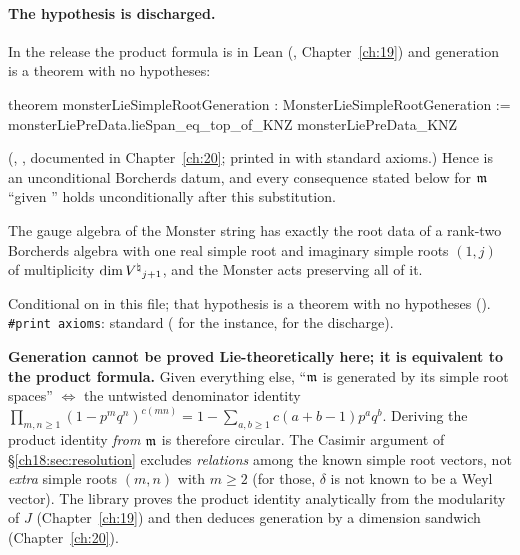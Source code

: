 \paragraph{The hypothesis is discharged.}  In the release the product formula is in Lean
(, Chapter~\ref{ch:19}) and generation is a theorem with no hypotheses:
\begin{leancode}
theorem monsterLieSimpleRootGeneration : MonsterLieSimpleRootGeneration :=
  monsterLiePreData.lieSpan_eq_top_of_KNZ monsterLiePreData_KNZ
\end{leancode}
(, ,
documented in Chapter~\ref{ch:20}; printed in  with standard axioms.)
Hence  is an unconditional Borcherds datum, and every
consequence stated below for $\mathfrak{m}$ ``given '' holds unconditionally after this substitution.
\begin{physics}
The gauge algebra of the Monster string has exactly the root data of a rank-two Borcherds algebra with one real
simple root and imaginary simple roots $(1,j)$ of multiplicity $\dim{V^{\natural}}_{j+1}$, and the Monster acts preserving all of it.
\end{physics}
\begin{status}
Conditional on  in this file; that hypothesis is a theorem with no
hypotheses ().  \texttt{\#print axioms}: standard
( for the instance,  for
the discharge).
\end{status}

\begin{warning}
\textbf{Generation cannot be proved Lie-theoretically here; it is equivalent to the product formula.}  Given everything else,
``$\mathfrak{m}$ is generated by its simple root spaces'' $\Longleftrightarrow$ the untwisted denominator identity
$\prod_{m,n\ge1}(1-p^mq^n)^{c(mn)}=1-\sum_{a,b\ge1}c(a+b-1)p^aq^b$.  Deriving the product identity \emph{from} $\mathfrak{m}$ is therefore
circular.  The Casimir argument of \S\ref{ch18:sec:resolution} excludes \emph{relations} among the known simple root
vectors, not \emph{extra} simple roots $(m,n)$ with $m\ge2$ (for those, $\delta$ is not known to be a Weyl vector).  The
library proves the product identity analytically from the modularity of $J$ (Chapter~\ref{ch:19}) and then deduces
generation by a dimension sandwich (Chapter~\ref{ch:20}).
\end{warning}

